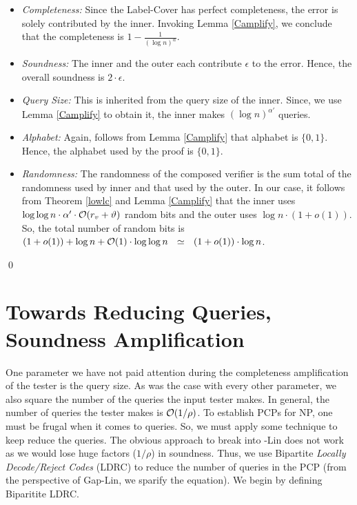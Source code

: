 \begin{itemize}
\item {\em Completeness:} Since the Label-Cover has perfect completeness,
  the error is solely contributed by the inner. Invoking Lemma
  \ref{Camplify}, we conclude that the completeness is $1 -
  \frac{1}{(\log n)^{\alpha}}$.

\item {\em Soundness:} The inner and the outer each contribute $\epsilon$ to the error.
  Hence, the overall soundness is $2 \cdot \epsilon$.

\item {\em Query Size:} This is inherited from the query size of the
  inner. Since, we use Lemma \ref{Camplify} to obtain it, the
  inner makes $(\log n)^{\alpha'}$ queries.

\item {\em Alphabet:} Again, follows from Lemma \ref{Camplify} that alphabet
  is $\{0,1\}$. Hence, the alphabet
used by the proof is $\{0,1\}$.

\item {\em Randomness:} The randomness of the composed verifier is the
  sum total of the randomness used by inner and that used by the
  outer. In our case, it follows from Theorem \ref{lowlc} and Lemma
  \ref{Camplify} that the inner uses $\log \log n \cdot \alpha' \cdot
  {\cal O}(r_v + \vartheta)$ random bits and the outer uses $\log
  n \cdot (1 +o(1))$. So, the total number of random bits
  is $(1 + o(1)) + \log n + {\cal O}(1) \cdot \log \log n \ \ \simeq \ \ (1 +
    o(1)) \cdot \log n$.
\end{itemize}
\qed



\section{Towards Reducing Queries, Soundness Amplification} \label{section:sound}

One parameter we have not paid attention during the completeness
amplification of the tester is the query size. As was the case with
every other parameter, we also square the number of the queries the
input tester makes. In general, the number of queries the tester makes
is ${\cal O}(1/\rho)$. To establish PCPs for {\sf NP}, one must be frugal
when it comes to queries. So, we must apply some technique to keep
reduce the queries. The obvious approach to break into {-Lin}
does not work as we would lose huge factors ($1/\rho$) in soundness. Thus, we use Bipartite {\em Locally
  Decode/Reject Codes} (LDRC) to reduce the number of queries in the
PCP (from the perspective of {\sc Gap-Lin}, we sparify the
equation). We begin by defining Biparitite LDRC.

